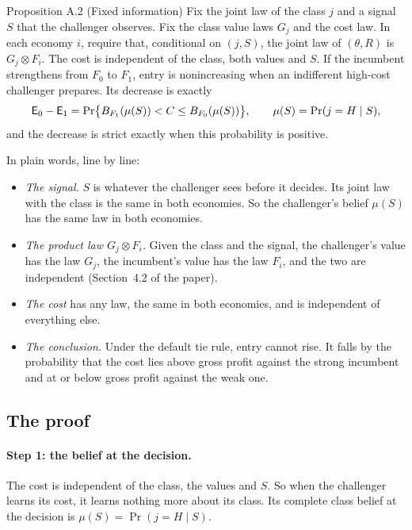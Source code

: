 \begin{paperresult}{Proposition A.2 (Fixed information)}
Fix the joint law of the class \(j\) and a signal \(S\) that the challenger observes. Fix the class value laws
\(G_j\) and the cost law. In each economy \(i\), require that, conditional on \((j,S)\), the joint law of
\((\theta,R)\) is \(G_j\otimes F_i\). The cost is independent of the class, both values and \(S\). If the incumbent
strengthens from \(F_0\) to \(F_1\), entry is nonincreasing when an indifferent high-cost challenger prepares. Its
decrease is exactly
\[
\mathsf{E}_0-\mathsf{E}_1=\Pr\bigl\{B_{F_1}(\mu(S))<C\le B_{F_0}(\mu(S))\bigr\},\qquad \mu(S)=\Pr(j=H\mid S),
\]
and the decrease is strict exactly when this probability is positive.
\end{paperresult}

In plain words, line by line:
\begin{itemize}
\item \emph{The signal.} \(S\) is whatever the challenger sees before it decides. Its joint law with the class is
  the same in both economies. So the challenger's belief \(\mu(S)\) has the same law in both economies.
\item \emph{The product law \(G_j\otimes F_i\).} Given the class and the signal, the challenger's value has the law
  \(G_j\), the incumbent's value has the law \(F_i\), and the two are independent (Section~4.2 of the paper).
\item \emph{The cost} has any law, the same in both economies, and is independent of everything else.
\item \emph{The conclusion.} Under the default tie rule, entry cannot rise. It falls by the probability that the
  cost lies above gross profit against the strong incumbent and at or below gross profit against the weak one.
\end{itemize}

\subsection{The proof}

\paragraph{Step 1: the belief at the decision.} The cost is independent of the class, the values and \(S\). So when
the challenger learns its cost, it learns nothing more about its class. Its complete class belief at the decision is
\(\mu(S)=\Pr(j=H\mid S)\).

